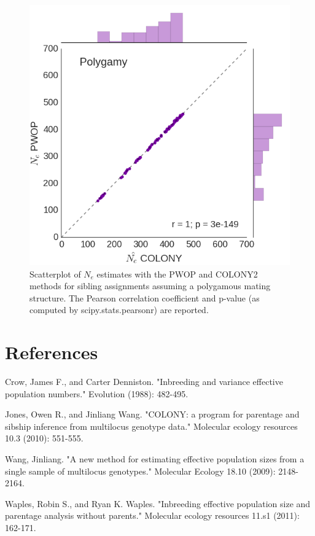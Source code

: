 \documentclass{article}
\begin{document}
\begin{figure}[h!]
	\caption{Scatterplot of $N_e$ estimates with the PWOP and COLONY2 methods for sibling assignments assuming a polygamous mating structure. The Pearson correlation coefficient and p-value (as computed by scipy.stats.pearsonr) are reported.}
	\centering
	\includegraphics[width=\textwidth]{./Polygamy_mating.png}
\end{figure}

\section*{References}
Crow, James F., and Carter Denniston. "Inbreeding and variance effective population numbers." Evolution (1988): 482-495.

Jones, Owen R., and Jinliang Wang. "COLONY: a program for parentage and sibship inference from multilocus genotype data." Molecular ecology resources 10.3 (2010): 551-555.

Wang, Jinliang. "A new method for estimating effective population sizes from a single sample of multilocus genotypes." Molecular Ecology 18.10 (2009): 2148-2164.

Waples, Robin S., and Ryan K. Waples. "Inbreeding effective population size and parentage analysis without parents." Molecular ecology resources 11.s1 (2011): 162-171.
\end{document}
